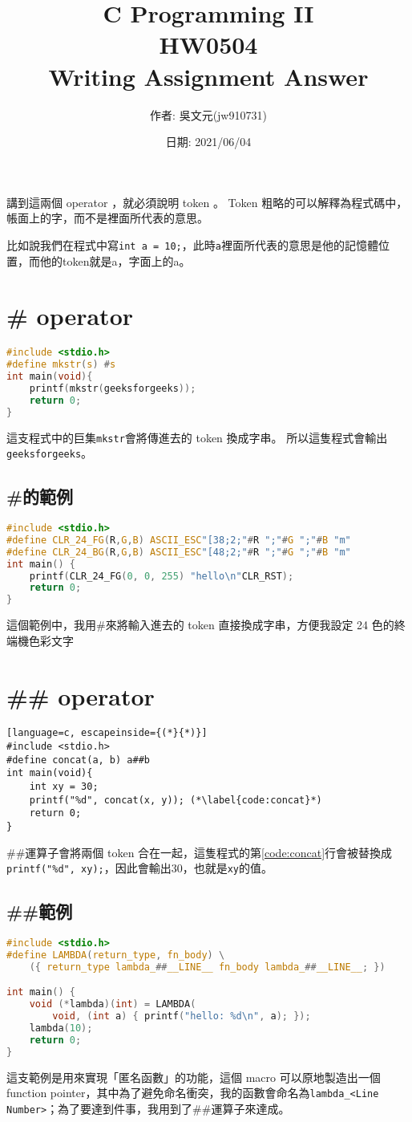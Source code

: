 \documentclass[a4paper,10pt]{article}
\title{C Programming II\\HW0504\\Writing Assignment Answer}
\author{作者: 吳文元(jw910731)}
\date{日期: 2021/06/04}
\begin{document}
\maketitle
講到這兩個 operator ，就必須說明 token 。 Token 粗略的可以解釋為程式碼中，帳面上的字，而不是裡面所代表的意思。

比如說我們在程式中寫\lstinline{int a = 10;}，此時\lstinline{a}裡面所代表的意思是他的記憶體位置，而他的token就是a，字面上的a。
\section{\# operator}
\begin{lstlisting}[language=c]
#include <stdio.h>
#define mkstr(s) #s
int main(void){       
    printf(mkstr(geeksforgeeks));
    return 0;
}
\end{lstlisting}
這支程式中的巨集\lstinline{mkstr}會將傳進去的 token 換成字串。
所以這隻程式會輸出\lstinline{geeksforgeeks}。
\subsection{\#的範例}
\begin{lstlisting}[language=c, caption={\#範例程式}]
#include <stdio.h>
#define CLR_24_FG(R,G,B) ASCII_ESC"[38;2;"#R ";"#G ";"#B "m"
#define CLR_24_BG(R,G,B) ASCII_ESC"[48;2;"#R ";"#G ";"#B "m"
int main() {
    printf(CLR_24_FG(0, 0, 255) "hello\n"CLR_RST);
    return 0;
}
\end{lstlisting}
這個範例中，我用\#來將輸入進去的 token 直接換成字串，方便我設定 24 色的終端機色彩文字
\section{\#\# operator}
\begin{lstlisting}[language=c, escapeinside={(*}{*)}]
#include <stdio.h>
#define concat(a, b) a##b
int main(void){
    int xy = 30;
    printf("%d", concat(x, y)); (*\label{code:concat}*)
    return 0;
}
\end{lstlisting}
\#\#運算子會將兩個 token 合在一起，這隻程式的第\ref{code:concat}行會被替換成\lstinline{printf("%d", xy);}，因此會輸出30，也就是\lstinline{xy}的值。

\subsection{\#\#範例}
\begin{lstlisting}[language=c, caption={\#\#範例程式\protect\footnotemark}]
#include <stdio.h>
#define LAMBDA(return_type, fn_body) \
    ({ return_type lambda_##__LINE__ fn_body lambda_##__LINE__; })

int main() {
    void (*lambda)(int) = LAMBDA(
        void, (int a) { printf("hello: %d\n", a); });
    lambda(10);
    return 0;
}
\end{lstlisting}

這支範例是用來實現「匿名函數」的功能，這個 macro 可以原地製造出一個 function pointer，其中為了避免命名衝突，我的函數會命名為\lstinline{lambda_<Line Number>}；為了要達到件事，我用到了\#\#運算子來達成。
\end{document}
